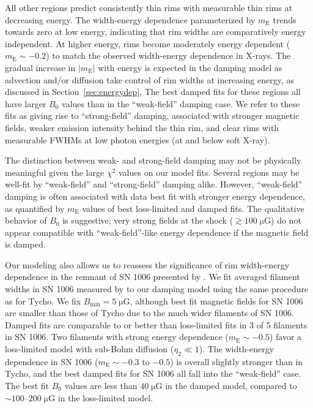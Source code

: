 \documentclass[iop, apj, numberedappendix]{emulateapj}
\newcommand*{\mt}{\mathrm}
\newcommand*{\unit}[1]{\;\mt{#1}}  %
\newcommand*{\abt}{\mathord{\sim}} %
\newcommand*{\mE}{m_\mt{E}}
\newcommand*{\Bmin}{B_{\mt{min}}}
\newcommand*{\muG}{\unit{\mu G}}
\begin{document}
All other regions predict consistently thin rims with measurable thin rims at
decreasing energy.  The width-energy dependence parameterized by $\mE$ trends
towards zero at low energy, indicating that rim widths are comparatively energy
independent.
At higher energy, rims become moderately energy dependent ($\mE \sim -0.2$) to
match the observed width-energy dependence in X-rays.  The gradual increase in
$|\mE|$ with energy is expected in the damping model as advection and/or
diffusion take
control of rim widths at increasing energy, as discussed in
Section~\ref{sec:energydep},  The best damped fits for these regions all have
larger $B_0$ values than in the ``weak-field'' damping case.  We refer to these
fits as giving rise to ``strong-field'' damping, associated with stronger
magnetic fields, weaker emission intensity behind the thin rim, and clear rims
with measurable FWHMs at low photon energies (at and below soft X-ray).

The distinction between weak- and strong-field damping may not
be physically meaningful given the large $\chi^2$ values on our model fits.
Several regions may be well-fit by ``weak-field'' and ``strong-field'' damping
alike.
However, ``weak-field'' damping is often associated with data best fit with
stronger energy dependence, as quantified by $\mE$ values of best loss-limited
and damped fits.  The qualitative behavior of $B_0$ is suggestive; very strong
fields at the shock ($\gtrsim 100 \muG$) do not appear compatible with
``weak-field''-like energy dependence if the magnetic field is damped.


Our modeling also allows us to reassess the significance of rim width-energy
dependence in the remnant of SN 1006 presented by .  We
fit averaged filament widths in SN 1006 measured by  to
our damping model using the same procedure as for Tycho.  We fix $\Bmin = 5
\muG$, although best fit magnetic fields for SN 1006 are smaller than those of
Tycho due to the much wider filaments of SN 1006.
Damped fits are comparable to or better than loss-limited fits in 3 of 5
filaments in SN 1006.  Two filaments with strong energy dependence ($\mE \sim
-0.5$) favor a loss-limited model with sub-Bohm diffusion ($\eta_2 \ll 1$).
The width-energy dependence in SN 1006 ($\mE \sim -0.3$ to $-0.5$) is overall
slightly stronger than in Tycho, and the best damped fits for SN 1006 all fall
into the ``weak-field'' case.  The best fit $B_0$ values are less than $40
\muG$ in the damped model, compared to $\abt 100$--$200 \muG$ in the
loss-limited model.
\end{document}

